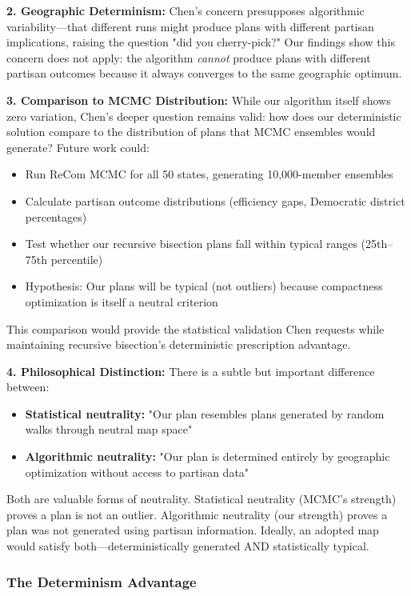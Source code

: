 \textbf{2. Geographic Determinism:} Chen's concern presupposes algorithmic variability—that different runs might produce plans with different partisan implications, raising the question "did you cherry-pick?" Our findings show this concern does not apply: the algorithm \textit{cannot} produce plans with different partisan outcomes because it always converges to the same geographic optimum.

\textbf{3. Comparison to MCMC Distribution:} While our algorithm itself shows zero variation, Chen's deeper question remains valid: how does our deterministic solution compare to the distribution of plans that MCMC ensembles would generate? Future work could:
\begin{itemize}
\item Run ReCom MCMC for all 50 states, generating 10,000-member ensembles
\item Calculate partisan outcome distributions (efficiency gaps, Democratic district percentages)
\item Test whether our recursive bisection plans fall within typical ranges (25th--75th percentile)
\item Hypothesis: Our plans will be typical (not outliers) because compactness optimization is itself a neutral criterion
\end{itemize}

This comparison would provide the statistical validation Chen requests while maintaining recursive bisection's deterministic prescription advantage.

\textbf{4. Philosophical Distinction:} There is a subtle but important difference between:
\begin{itemize}
\item \textbf{Statistical neutrality:} "Our plan resembles plans generated by random walks through neutral map space"
\item \textbf{Algorithmic neutrality:} "Our plan is determined entirely by geographic optimization without access to partisan data"
\end{itemize}

Both are valuable forms of neutrality. Statistical neutrality (MCMC's strength) proves a plan is not an outlier. Algorithmic neutrality (our strength) proves a plan was not generated using partisan information. Ideally, an adopted map would satisfy both—deterministically generated AND statistically typical.

\subsubsection{The Determinism Advantage}

